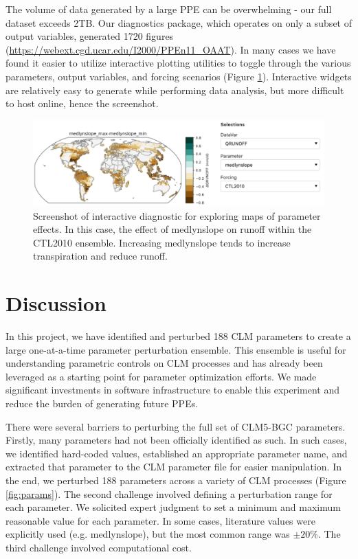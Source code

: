 \documentclass[draft]{agujournal2019}
\begin{document}
The volume of data generated by a large PPE can be overwhelming - our full dataset exceeds 2TB.  Our diagnostics package, which operates on only a subset of output variables, generated 1720 figures (\url{https://webext.cgd.ucar.edu/I2000/PPEn11_OAAT}). In many cases we have found it easier to utilize interactive plotting utilities to toggle through the various parameters, output variables, and forcing scenarios (Figure \ref{fig:panel}). Interactive widgets are relatively easy to generate while performing data analysis, but more difficult to host online, hence the screenshot.

\begin{figure}[h]
\centering
\includegraphics[width=40pc]{../figs/deltmap_panel.pdf}
\caption{Screenshot of interactive diagnostic for exploring maps of parameter effects. In this case, the effect of medlynslope on runoff within the CTL2010 ensemble. Increasing medlynslope tends to increase transpiration and reduce runoff.}
\label{fig:panel}
\end{figure}

\section{Discussion}

In this project, we have identified and perturbed 188 CLM parameters to create a large one-at-a-time parameter perturbation ensemble. This ensemble is useful for understanding parametric controls on CLM processes and has already been leveraged as a starting point for parameter optimization efforts. We made significant investments in software infrastructure to enable this experiment and reduce the burden of generating future PPEs.

There were several barriers to perturbing the full set of CLM5-BGC parameters. Firstly, many parameters had not been officially identified as such. In such cases, we identified hard-coded values, established an appropriate parameter name, and extracted that parameter to the CLM parameter file for easier manipulation. In the end, we perturbed 188 parameters across a variety of CLM processes (Figure \ref{fig:params}). The second challenge involved defining a perturbation range for each parameter. We solicited expert judgment to set a minimum and maximum reasonable value for each parameter. In some cases, literature values were explicitly used (e.g. medlynslope), but the most common range was $\pm20\%$. The third challenge involved computational cost.
\end{document}
